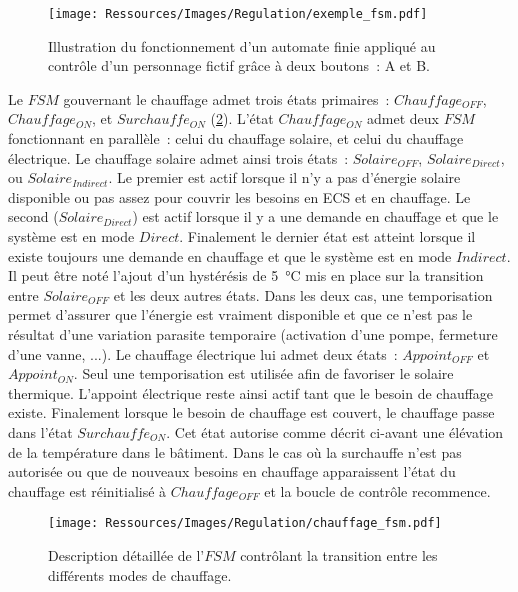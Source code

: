 \begin{figure}
    \begin{center}
        \texttt{[image: Ressources/Images/Regulation/exemple\_fsm.pdf]}
    \end{center}
    \caption{Illustration du fonctionnement d’un automate finie appliqué au contrôle
             d’un personnage fictif grâce à deux boutons~: A et B.
             \label{fig:automate_fini}}
\end{figure}


Le $FSM$ gouvernant le chauffage admet trois états primaires~: $Chauffage_{OFF}$,
$Chauffage_{ON}$, et $Surchauffe_{ON}$ (\ref{fig:automate_chauffage}). L’état
$Chauffage_{ON}$ admet deux $FSM$ fonctionnant en parallèle~: celui du chauffage
solaire, et celui du chauffage électrique. Le chauffage solaire admet ainsi trois états~:
$Solaire_{OFF}$, $Solaire_{Direct}$, ou $Solaire_{Indirect}$. Le premier est actif lorsque
il n’y a pas d’énergie solaire disponible ou pas assez pour couvrir les besoins en ECS et
en chauffage. Le second ($Solaire_{Direct}$) est actif lorsque il y a une demande en
chauffage et que le système est en mode $Direct$. Finalement le dernier état est atteint
lorsque il existe toujours une demande en chauffage et que le système est en mode
$Indirect$.
Il peut être noté l’ajout d’un hystérésis de \SI{5}{\celsius} mis en place sur la
transition entre $Solaire_{OFF}$ et les deux autres états. Dans les deux cas, une
temporisation permet d’assurer que l’énergie est vraiment disponible et que ce n’est pas
le résultat d’une variation parasite temporaire (activation d’une pompe, fermeture d’une
vanne, ...). Le chauffage électrique lui admet deux états~: $Appoint_{OFF}$ et
$Appoint_{ON}$. Seul une temporisation est utilisée afin de favoriser le solaire thermique.
L’appoint électrique reste ainsi actif tant que le besoin de chauffage existe. Finalement
lorsque le besoin de chauffage est couvert, le chauffage passe dans l’état
$Surchauffe_{ON}$. Cet état autorise comme décrit ci-avant une élévation de la température
dans le bâtiment. Dans le cas où la surchauffe n’est pas autorisée ou que de nouveaux
besoins en chauffage apparaissent l’état du chauffage est réinitialisé à $Chauffage_{OFF}$
et la boucle de contrôle recommence.

\begin{figure}
    \begin{center}
        \texttt{[image: Ressources/Images/Regulation/chauffage\_fsm.pdf]}
    \end{center}
    \caption{Description détaillée de l’$FSM$ contrôlant la transition entre
             les différents modes de chauffage.
             \label{fig:automate_chauffage}}
\end{figure}


